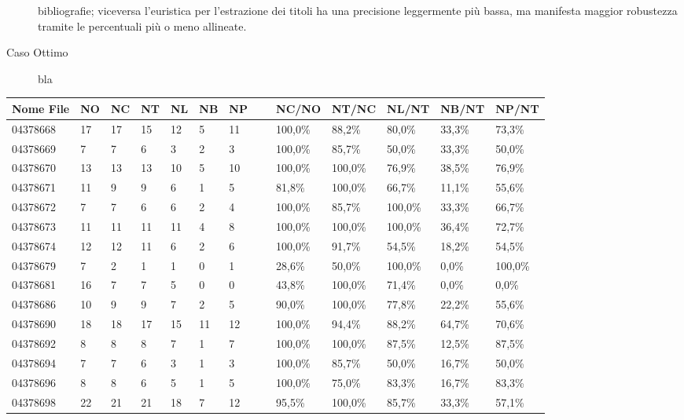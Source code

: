 \begin{description}
bibliografie; viceversa l'euristica per l'estrazione dei titoli ha una precisione leggermente più bassa, ma manifesta maggior robustezza tramite le percentuali più o meno allineate.
	\item[Caso Ottimo] bla
\end{description}


	\begin{table}\label{tab:icdar}
	\begin{center}
	\begin{tabular}{|l|l|l|l|l|l|l|l|l|l|l|l|l|} \hline
Nome File & NO & NC & NT & NL & NB & NP & ~ & NC/NO & NT/NC & NL/NT & NB/NT & NP/NT \\ \hline
04378668 & 17 & 17 & 15 & 12 & 5 & 11 & ~ & 100,0\% & 88,2\% & 80,0\% & 33,3\% & 73,3\% \\
04378669 & 7 & 7 & 6 & 3 & 2 & 3 & ~ & 100,0\% & 85,7\% & 50,0\% & 33,3\% & 50,0\%\\
04378670 & 13 & 13 & 13 & 10 & 5 & 10 & ~ & 100,0\% & 100,0\% & 76,9\% & 38,5\% & 76,9\%\\
04378671 & 11 & 9 & 9 & 6 & 1 & 5 & ~ & 81,8\% & 100,0\% & 66,7\% & 11,1\% & 55,6\%\\
04378672 & 7 & 7 & 6 & 6 & 2 & 4 & ~ & 100,0\% & 85,7\% & 100,0\% & 33,3\% & 66,7\%\\
04378673 & 11 & 11 & 11 & 11 & 4 & 8 & ~ & 100,0\% & 100,0\% & 100,0\% & 36,4\% & 72,7\%\\
04378674 & 12 & 12 & 11 & 6 & 2 & 6 & ~ & 100,0\% & 91,7\% & 54,5\% & 18,2\% & 54,5\%\\
04378679 & 7 & 2 & 1 & 1 & 0 & 1 & ~ & 28,6\% & 50,0\% & 100,0\% & 0,0\% & 100,0\%\\
04378681 & 16 & 7 & 7 & 5 & 0 & 0 & ~ & 43,8\% & 100,0\% & 71,4\% & 0,0\% & 0,0\%\\
04378686 & 10 & 9 & 9 & 7 & 2 & 5 & ~ & 90,0\% & 100,0\% & 77,8\% & 22,2\% & 55,6\%\\
04378690 & 18 & 18 & 17 & 15 & 11 & 12 & ~ & 100,0\% & 94,4\% & 88,2\% & 64,7\% & 70,6\%\\
04378692 & 8 & 8 & 8 & 7 & 1 & 7 & ~ & 100,0\% & 100,0\% & 87,5\% & 12,5\% & 87,5\%\\
04378694 & 7 & 7 & 6 & 3 & 1 & 3 & ~ & 100,0\% & 85,7\% & 50,0\% & 16,7\% & 50,0\%\\
04378696 & 8 & 8 & 6 & 5 & 1 & 5 & ~ & 100,0\% & 75,0\% & 83,3\% & 16,7\% & 83,3\%\\
04378698 & 22 & 21 & 21 & 18 & 7 & 12 & ~ & 95,5\% & 100,0\% & 85,7\% & 33,3\% & 57,1\%\\

\end{tabular}
\end{center}
\end{table}
